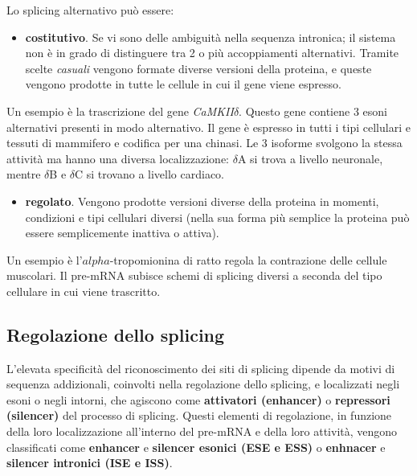 \documentclass[11pt]{book}
\begin{document}
Lo splicing alternativo può essere:

\begin{itemize}
\itemsep1pt\parskip0pt
\item
  \textbf{costitutivo}. Se vi sono delle ambiguità nella sequenza
  intronica; il sistema non è in grado di distinguere tra 2 o più
  accoppiamenti alternativi. Tramite scelte \emph{casuali} vengono
  formate diverse versioni della proteina, e queste vengono prodotte in
  tutte le cellule in cui il gene viene espresso.
\end{itemize}

Un esempio è la trascrizione del gene \emph{CaMKII\(\delta\)}. Questo
gene contiene 3 esoni alternativi presenti in modo alternativo. Il gene
è espresso in tutti i tipi cellulari e tessuti di mammifero e codifica
per una chinasi. Le 3 isoforme svolgono la stessa attività ma hanno una
diversa localizzazione: \(\delta\)A si trova a livello neuronale, mentre
\(\delta\)B e \(\delta\)C si trovano a livello cardiaco.

\begin{itemize}
\itemsep1pt\parskip0pt
\item
  \textbf{regolato}. Vengono prodotte versioni diverse della proteina in
  momenti, condizioni e tipi cellulari diversi (nella sua forma più
  semplice la proteina può essere semplicemente inattiva o attiva).
\end{itemize}

Un esempio è l'\(alpha\)-tropomionina di ratto regola la contrazione
delle cellule muscolari. Il pre-mRNA subisce schemi di splicing diversi
a seconda del tipo cellulare in cui viene trascritto.

\subsection{Regolazione dello
splicing}\label{regolazione-dello-splicing}

L'elevata specificità del riconoscimento dei siti di splicing dipende da
motivi di sequenza addizionali, coinvolti nella regolazione dello
splicing, e localizzati negli esoni o negli intorni, che agiscono come
\textbf{attivatori (enhancer)} o \textbf{repressori (silencer)} del
processo di splicing. Questi elementi di regolazione, in funzione della
loro localizzazione all'interno del pre-mRNA e della loro attività,
vengono classificati come \textbf{enhancer} e \textbf{silencer esonici
(ESE e ESS)} o \textbf{enhnacer} e \textbf{silencer intronici (ISE e
ISS)}.
\end{document}

